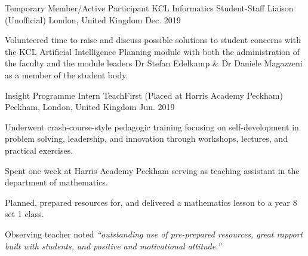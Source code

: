 

\begin{cventries}

  \cventry
  {Temporary Member/Active Participant} %
  {KCL Informatics Student-Staff Liaison (Unofficial)} %
  {London, United Kingdom} %
  {Dec. 2019} %
  {
    \begin{cvitems} %
      \item {Volunteered time to raise and discuss possible solutions to student concerns with the KCL Artificial Intelligence Planning module with both the administration of the faculty and the module leaders Dr Stefan Edelkamp \& Dr Daniele Magazzeni as a member of the student body.}
    \end{cvitems}
  }

  \cventry
  {Insight Programme Intern} %
  {TeachFirst (Placed at Harris Academy Peckham)} %
  {Peckham, London, United Kingdom} %
  {Jun. 2019} %
  {
    \begin{cvitems} %
      \item {Underwent crash-course-style pedagogic training focusing on self-development in problem solving, leadership, and innovation through workshops, lectures, and practical exercises.}
      \item {Spent one week at Harris Academy Peckham serving as teaching assistant in the department of mathematics.}
      \item {Planned, prepared resources for, and delivered a mathematics lesson to a year 8 set 1 class.}
      \item {Observing teacher noted \textit{``outstanding use of pre-prepared resources, great rapport built with students, and positive and motivational attitude.''}}
    \end{cvitems}
  }


\end{cventries}
